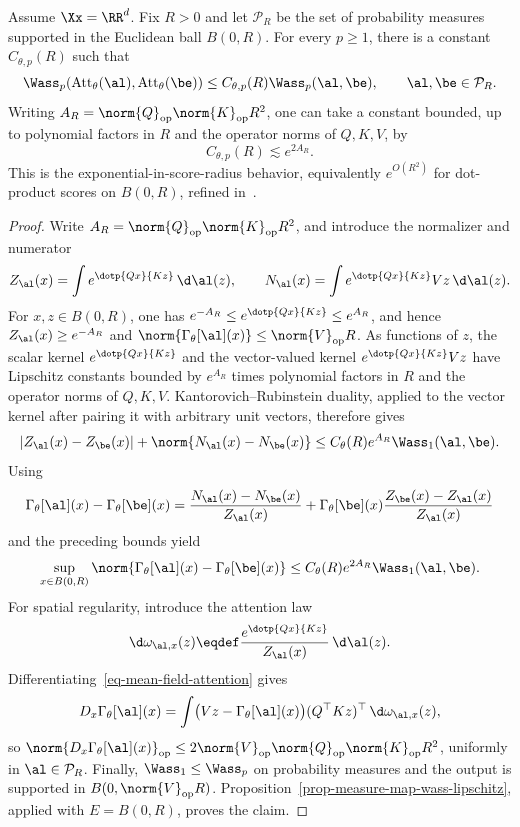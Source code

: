 \begin{prop}\label{prop-attention-wass-lipschitz}
	Assume $\Xx=\RR^d$. Fix $R>0$ and let $\mathcal P_R$ be the set of probability measures supported in the Euclidean ball $B(0,R)$. For every $p\geq1$, there is a constant $C_{\theta,p}(R)$ such that
	\[
		\Wass_p(\operatorname{Att}_\theta(\al),\operatorname{Att}_\theta(\be))
		\leq C_{\theta,p}(R)\Wass_p(\al,\be),
		\qquad \al,\be\in\mathcal P_R.
	\]
	Writing $A_R=\norm{Q}_{\rm op}\norm{K}_{\rm op}R^2$, one can take a constant bounded, up to polynomial factors in $R$ and the operator norms of $Q,K,V$, by
	\[
		C_{\theta,p}(R)\lesssim
		e^{2A_R}.
	\]
	This is the exponential-in-score-radius behavior, equivalently $e^{O(R^2)}$ for dot-product scores on $B(0,R)$, refined in~\cite{CastinAblinPeyre2024HowSmoothAttention}.
\end{prop}
\begin{proof}
	Write \(A_R=\norm{Q}_{\rm op}\norm{K}_{\rm op}R^2\), and introduce the normalizer and numerator
	\[
		Z_\al(x)=\int e^{\dotp{Qx}{Kz}}\,\d\al(z),
		\qquad
		N_\al(x)=\int e^{\dotp{Qx}{Kz}}Vz\,\d\al(z).
	\]
	For \(x,z\in B(0,R)\), one has \(e^{-A_R}\leq e^{\dotp{Qx}{Kz}}\leq e^{A_R}\), and hence \(Z_\al(x)\geq e^{-A_R}\) and \(\norm{\Gamma_\theta[\al](x)}\leq\norm{V}_{\rm op}R\). As functions of \(z\), the scalar kernel \(e^{\dotp{Qx}{Kz}}\) and the vector-valued kernel \(e^{\dotp{Qx}{Kz}}Vz\) have Lipschitz constants bounded by \(e^{A_R}\) times polynomial factors in \(R\) and the operator norms of \(Q,K,V\). Kantorovich--Rubinstein duality, applied to the vector kernel after pairing it with arbitrary unit vectors, therefore gives
	\[
		|Z_\al(x)-Z_\be(x)|
		+
		\norm{N_\al(x)-N_\be(x)}
		\leq C_{\theta}(R)e^{A_R}\Wass_1(\al,\be).
	\]
	Using
	\[
		\Gamma_\theta[\al](x)-\Gamma_\theta[\be](x)
		=
		\frac{N_\al(x)-N_\be(x)}{Z_\al(x)}
		+
		\Gamma_\theta[\be](x)
		\frac{Z_\be(x)-Z_\al(x)}{Z_\al(x)}
	\]
	and the preceding bounds yield
	\[
		\sup_{x\in B(0,R)}
		\norm{\Gamma_\theta[\al](x)-\Gamma_\theta[\be](x)}
		\leq C_{\theta}(R)e^{2A_R}\Wass_1(\al,\be).
	\]
	For spatial regularity, introduce the attention law
	\[
		\d\omega_{\al,x}(z)
		\eqdef
		\frac{e^{\dotp{Qx}{Kz}}}{Z_\al(x)}\,\d\al(z).
	\]
	Differentiating~\eqref{eq-mean-field-attention} gives
	\[
		D_x\Gamma_\theta[\al](x)
		=
		\int
		\bigl(Vz-\Gamma_\theta[\al](x)\bigr)
		(Q^\top Kz)^\top
		\,\d\omega_{\al,x}(z),
	\]
	so \(\norm{D_x\Gamma_\theta[\al](x)}_{\rm op}\leq2\norm{V}_{\rm op}\norm{Q}_{\rm op}\norm{K}_{\rm op}R^2\), uniformly in \(\al\in\mathcal P_R\). Finally, \(\Wass_1\leq\Wass_p\) on probability measures and the output is supported in \(B(0,\norm{V}_{\rm op}R)\). Proposition~\ref{prop-measure-map-wass-lipschitz}, applied with \(E=B(0,R)\), proves the claim.
\end{proof}

